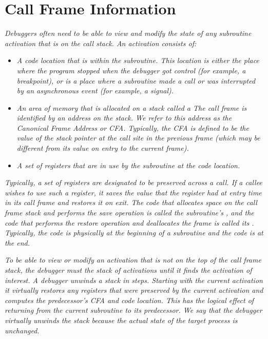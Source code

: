 \section{Call Frame Information}
\label{chap:callframeinformation}

\textit{Debuggers often need to be able to view and modify the 
state of any subroutine activation that is
on the call stack. An activation consists of:}

\begin{itemize}
\item \textit{A code location that is within the
subroutine. This location is either the place where the program
stopped when the debugger got control (for example, a breakpoint), or
is a place where a subroutine made a call or was interrupted
by an asynchronous event (for example, a signal).}

\item \textit{An area of memory that is allocated on a stack called a
 The call frame is identified by an address
on the stack. We refer to this address as the Canonical
Frame Address or CFA. Typically, the CFA is defined to be the
value of the stack pointer at the call site in the previous
frame (which may be different from its value on entry to the
current frame).}

\item \textit{A set of registers that are in use by the subroutine
at the code location.}

\end{itemize}

\textit{Typically, a set of registers are designated to be preserved
across a call. If a callee wishes to use such a register, it
saves the value that the register had at entry time in its call
frame and restores it on exit. The code that allocates space
on the call frame stack and performs the save operation is
called the subroutine\textquoteright s , and the code that performs
the restore operation and deallocates the frame is called its
. Typically, the 
 code is physically at the
beginning of a subroutine and the 
 code is at the end.}

\textit{To be able to view or modify an activation that is not
on the top of the call frame stack, the debugger must
 the stack of activations until
it finds the activation of interest.  A debugger unwinds
a stack in steps. Starting with the current activation it
virtually restores any registers that were preserved by the
current activation and computes the predecessor\textquoteright s CFA and
code location. This has the logical effect of returning from
the current subroutine to its predecessor. We say that the
debugger virtually unwinds the stack because the actual state
of the target process is unchanged.}


